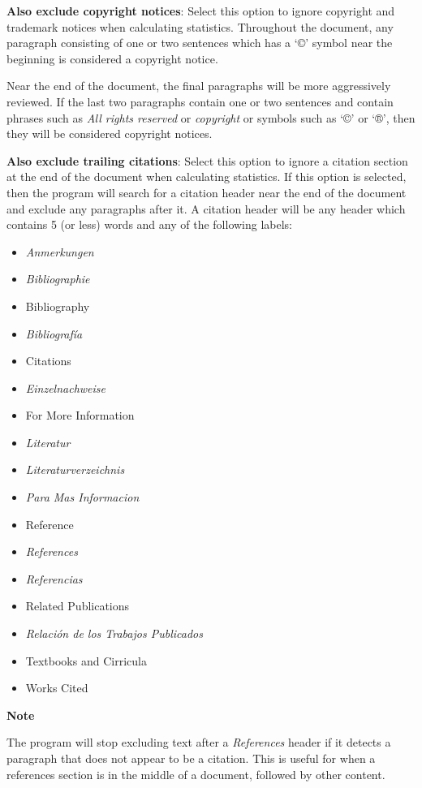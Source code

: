 \documentclass[
]{book}
\providecommand{\tightlist}{%
  \setlength{\itemsep}{0pt}\setlength{\parskip}{0pt}}
\newenvironment{notesection}
    {
    \begin{tcolorbox}[colframe=mediumblue,colback=lightblue,coltext=mediumblue,arc=3mm]
    \faLightbulb[regular] \textbf{Note} \newline
    }
    {
    \end{tcolorbox}
    }
\theoremstyle{definition}
\theoremstyle{definition}
\theoremstyle{definition}
\theoremstyle{definition}
\theoremstyle{remark}
\begin{document}
\textbf{Also exclude copyright notices}: Select this option to ignore copyright and trademark notices when calculating statistics. Throughout the document, any paragraph consisting of one or two sentences which has a `©' symbol near the beginning is considered a copyright notice.

Near the end of the document, the final paragraphs will be more aggressively reviewed. If the last two paragraphs contain one or two sentences and contain phrases such as \emph{All rights reserved} or \emph{copyright} or symbols such as `©' or `®', then they will be considered copyright notices.

\textbf{Also exclude trailing citations}: Select this option to ignore a citation section at the end of the document when calculating statistics. If this option is selected, then the program will search for a citation header near the end of the document and exclude any paragraphs after it. A citation header will be any header which contains 5 (or less) words and any of the following labels:

\begin{itemize}
\tightlist
\item
  \emph{Anmerkungen}
\item
  \emph{Bibliographie}
\item
  Bibliography
\item
  \emph{Bibliografía}
\item
  Citations
\item
  \emph{Einzelnachweise}
\item
  For More Information
\item
  \emph{Literatur}
\item
  \emph{Literaturverzeichnis}
\item
  \emph{Para Mas Informacion}
\item
  Reference
\item
  \emph{References}
\item
  \emph{Referencias}
\item
  Related Publications
\item
  \emph{Relación de los Trabajos Publicados}
\item
  Textbooks and Cirricula
\item
  Works Cited
\end{itemize}

\begin{notesection}
The program will stop excluding text after a \emph{References} header if it detects a paragraph that does not appear to be a citation. This is useful for when a references section is in the middle of a document, followed by other content.

\end{notesection}
\end{document}
